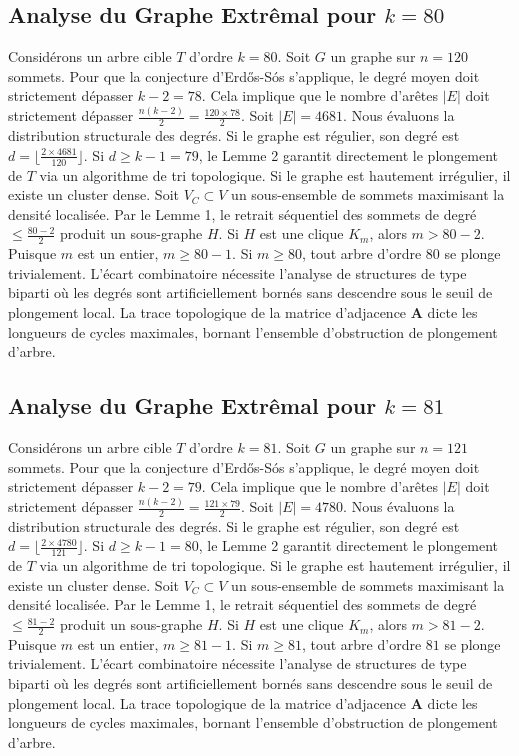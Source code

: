 \documentclass[11pt,a4paper]{article}
\begin{document}
\subsection{Analyse du Graphe Extr\^emal pour $k=80$}
Consid\'erons un arbre cible $T$ d'ordre $k=80$.
Soit $G$ un graphe sur $n=120$ sommets.
Pour que la conjecture d'Erd\H{o}s-S\'os s'applique, le degr\'e moyen doit strictement d\'epasser $k-2 = 78$.
Cela implique que le nombre d'ar\^etes $|E|$ doit strictement d\'epasser $\frac{n(k-2)}{2} = \frac{120 \times 78}{2}$.
Soit $|E| = 4681$.
Nous \'evaluons la distribution structurale des degr\'es. Si le graphe est r\'egulier, son degr\'e est $d = \lfloor \frac{2 \times 4681}{120} \rfloor$.
Si $d \geq k-1 = 79$, le Lemme 2 garantit directement le plongement de $T$ via un algorithme de tri topologique.
Si le graphe est hautement irr\'egulier, il existe un cluster dense. Soit $V_C \subset V$ un sous-ensemble de sommets maximisant la densit\'e localis\'ee.
Par le Lemme 1, le retrait s\'equentiel des sommets de degr\'e $\leq \frac{80-2}{2}$ produit un sous-graphe $H$.
Si $H$ est une clique $K_{m}$, alors $m > 80-2$. Puisque $m$ est un entier, $m \geq 80-1$. Si $m \geq 80$, tout arbre d'ordre $80$ se plonge trivialement.
L'\'ecart combinatoire n\'ecessite l'analyse de structures de type biparti o\`u les degr\'es sont artificiellement born\'es sans descendre sous le seuil de plongement local. La trace topologique de la matrice d'adjacence $\mathbf{A}$ dicte les longueurs de cycles maximales, bornant l'ensemble d'obstruction de plongement d'arbre.


\subsection{Analyse du Graphe Extr\^emal pour $k=81$}
Consid\'erons un arbre cible $T$ d'ordre $k=81$.
Soit $G$ un graphe sur $n=121$ sommets.
Pour que la conjecture d'Erd\H{o}s-S\'os s'applique, le degr\'e moyen doit strictement d\'epasser $k-2 = 79$.
Cela implique que le nombre d'ar\^etes $|E|$ doit strictement d\'epasser $\frac{n(k-2)}{2} = \frac{121 \times 79}{2}$.
Soit $|E| = 4780$.
Nous \'evaluons la distribution structurale des degr\'es. Si le graphe est r\'egulier, son degr\'e est $d = \lfloor \frac{2 \times 4780}{121} \rfloor$.
Si $d \geq k-1 = 80$, le Lemme 2 garantit directement le plongement de $T$ via un algorithme de tri topologique.
Si le graphe est hautement irr\'egulier, il existe un cluster dense. Soit $V_C \subset V$ un sous-ensemble de sommets maximisant la densit\'e localis\'ee.
Par le Lemme 1, le retrait s\'equentiel des sommets de degr\'e $\leq \frac{81-2}{2}$ produit un sous-graphe $H$.
Si $H$ est une clique $K_{m}$, alors $m > 81-2$. Puisque $m$ est un entier, $m \geq 81-1$. Si $m \geq 81$, tout arbre d'ordre $81$ se plonge trivialement.
L'\'ecart combinatoire n\'ecessite l'analyse de structures de type biparti o\`u les degr\'es sont artificiellement born\'es sans descendre sous le seuil de plongement local. La trace topologique de la matrice d'adjacence $\mathbf{A}$ dicte les longueurs de cycles maximales, bornant l'ensemble d'obstruction de plongement d'arbre.
\end{document}
